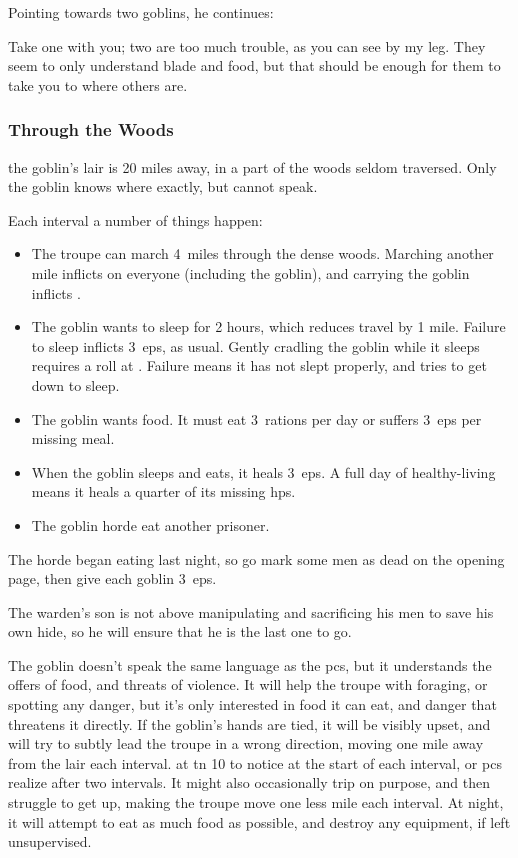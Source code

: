 \documentclass[10pt,twoside]{book}
\begin{document}
Pointing towards two goblins, he continues:

\begin{speechtext}
  Take one with you; two are too much trouble, as you can see by my leg.
  They seem to only understand blade and food, but that should be enough for them to take you to where others are.
\end{speechtext}

\subsubsection{Through the Woods}
the goblin's lair is 20 miles away, in a part of the woods seldom traversed.
Only the goblin knows where exactly, but cannot speak.

%
Each \gls{interval} a number of things happen:

\begin{itemize}
  \item
  The troupe can march 4~miles through the dense woods.
  Marching another mile inflicts  on everyone (including the goblin), and carrying the goblin inflicts .
  \item
  The goblin wants to sleep for 2 hours, which reduces travel by 1 mile.
  Failure to sleep inflicts 3~\glspl{ep}, as usual.
  Gently cradling the goblin while it sleeps requires a  roll at \tn[8].
  Failure means it has not slept properly, and tries to get down to sleep.
  \item
  The goblin wants food.
  It must eat 3~\glspl{ration} per day or suffers 3~\glspl{ep} per missing meal.
  \item
  When the goblin sleeps and eats, it heals 3~\glspl{ep}.
  A full day of healthy-living means it heals a quarter of its missing \glspl{hp}.
  \item
  The goblin horde eat another prisoner.
\end{itemize}

The horde began eating last night, so go mark some men as dead on the opening page, then give each goblin 3~\glspl{ep}.

The \gls{warden}'s son is not above manipulating and sacrificing his men to save his own hide, so he will ensure that he is the last one to go.

The goblin doesn't speak the same language as the \glspl{pc}, but it understands the offers of food, and threats of violence.
It will help the troupe with foraging, or spotting any danger, but it's only interested in food it can eat, and danger that threatens it directly.
If the goblin's hands are tied, it will be visibly upset, and will try to subtly lead the troupe in a wrong direction, moving one mile away from the lair each \gls{interval}.
 at \gls{tn} 10 to notice at the start of each \gls{interval}, or \glspl{pc} realize after two \glspl{interval}.
It might also occasionally trip on purpose, and then struggle to get up, making the troupe move one less mile each \gls{interval}.
At night, it will attempt to eat as much food as possible, and destroy any equipment, if left unsupervised.
\end{document}
